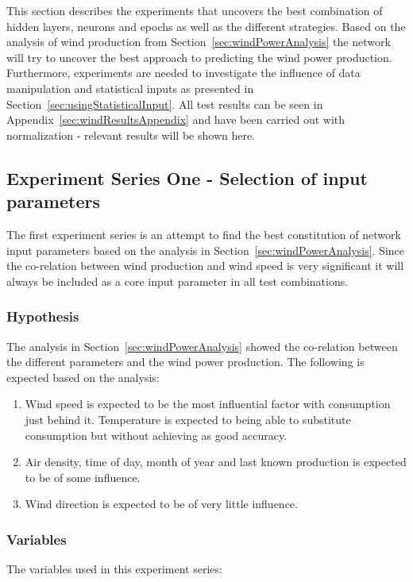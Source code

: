 This section describes the experiments that uncovers the best combination of hidden layers, neurons and epochs as well as the different strategies. Based on the analysis of wind production from Section~\ref{sec:windPowerAnalysis} the network will try to uncover the best approach to predicting the wind power production. Furthermore, experiments are needed to investigate the influence of data manipulation and statistical inputs as presented in Section~\ref{sec:usingStatisticalInput}. All test results can be seen in Appendix~\ref{sec:windResultsAppendix} and have been carried out with normalization - relevant results will be shown here. 


\subsection{Experiment Series One - Selection of input parameters}
The first experiment series is an attempt to find the best constitution of network input parameters based on the analysis in Section~\ref{sec:windPowerAnalysis}. Since the co-relation between wind production and wind speed is very significant it will always be included as a core input parameter in all test combinations.

\subsubsection{Hypothesis}
The analysis in Section~\ref{sec:windPowerAnalysis} showed the co-relation between the different parameters and the wind power production. The following is expected based on the analysis:

\begin{enumerate}
\item Wind speed is expected to be the most influential factor with consumption just behind it. Temperature is expected to being able to substitute consumption but without achieving as good accuracy. 
\item Air density, time of day, month of year and last known production is expected to be of some influence.
\item Wind direction is expected to be of very little influence.
\end{enumerate}

\subsubsection{Variables}
The variables used in this experiment series:

